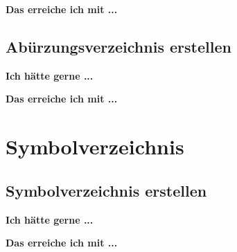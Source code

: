 \documentclass[twoside, 
               a4paper, 
               10pt, 
               parskip=full, 
               sectionentrydots=true, 
               listof=totoc, 
               listof=entryprefix,
               numbers=endperiod]{scrartcl}
\begin{document}
\newpage
{\textbf {Das erreiche ich mit ...}}
 
\begin{miniSeite}[colbacktitle=black!35!white,title=\LaTeX-Code]

\end{miniSeite}




\newpage
\subsection{Abürzungsverzeichnis erstellen}
{\textbf {Ich hätte gerne ...}}
 
\begin{miniSeite}[colbacktitle=black!35!white,title=Ausdruck]

\end{miniSeite}


\newpage
{\textbf {Das erreiche ich mit ...}}
 
\begin{miniSeite}[colbacktitle=black!35!white,title=\LaTeX-Code]

\end{miniSeite}





\newpage
\section{Symbolverzeichnis}
\subsection{Symbolverzeichnis erstellen}
{\textbf {Ich hätte gerne ...}}

\begin{miniSeite}[colbacktitle=black!35!white,title=Ausdruck]

\end{miniSeite} 

\newpage
{\textbf {Das erreiche ich mit ...}}
 
\begin{miniSeite}[colbacktitle=black!35!white,title=\LaTeX-Code]

\end{miniSeite}

\end{document}
